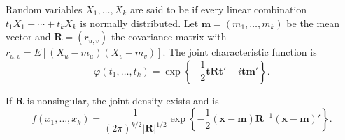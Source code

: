 Random variables $X_1, \ldots, X_k$ are said to be  if every linear combination $t_1 X_1 + \cdots + t_k X_k$ is normally distributed. Let $\mathbf{m} = (m_1, \ldots, m_k)$ be the mean vector and $\mathbf{R} = (r_{u,v})$ the covariance matrix with $r_{u,v} = E[(X_u - m_u)(X_v - m_v)]$. The joint characteristic function is
$$\varphi(t_1, \ldots, t_k) = \exp\left\{-\frac{1}{2} \mathbf{t} \mathbf{R} \mathbf{t}' + i \mathbf{t} \mathbf{m}'\right\}.$$

If $\mathbf{R}$ is nonsingular, the joint density exists and is
$$f(x_1, \ldots, x_k) = \frac{1}{(2\pi)^{k/2} |\mathbf{R}|^{1/2}} \exp\left\{-\frac{1}{2} (\mathbf{x} - \mathbf{m}) \mathbf{R}^{-1} (\mathbf{x} - \mathbf{m})'\right\}.$$
